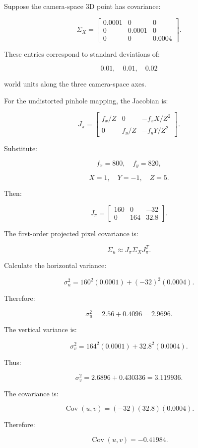 \hypertarget{02-foundations-ii-ch037-derive-the-image-space-uncertainty}{}

Suppose the camera-space 3D point has covariance:

\[
 \Sigma_X= \begin{bmatrix} 0.0001&0&0\\ 0&0.0001&0\\ 0&0&0.0004 \end{bmatrix}.
\]

These entries correspond to standard deviations of:

\[
 0.01,\quad0.01,\quad0.02
\]

world units along the three camera-space axes.

For the undistorted pinhole mapping, the Jacobian is:

\[
 J_\pi= \begin{bmatrix} f_x/Z&0&-f_xX/Z^2\\ 0&f_y/Z&-f_yY/Z^2 \end{bmatrix}.
\]

Substitute:

\[
 f_x=800,\quad f_y=820,
\]

\[
 X=1,\quad Y=-1,\quad Z=5.
\]

Then:

\[
 \boxed{ J_\pi= \begin{bmatrix} 160&0&-32\\ 0&164&32.8 \end{bmatrix} }.
\]

The first-order projected pixel covariance is:

\[
 \Sigma_u\approx J_\pi\Sigma_XJ_\pi^T.
\]

Calculate the horizontal variance:

\[
 \sigma_u^2= 160^2(0.0001)+(-32)^2(0.0004).
\]

Therefore:

\[
 \sigma_u^2=2.56+0.4096 =\boxed{2.9696}.
\]

The vertical variance is:

\[
 \sigma_v^2= 164^2(0.0001)+32.8^2(0.0004).
\]

Thus:

\[
 \sigma_v^2= 2.6896+0.430336 =\boxed{3.119936}.
\]

The covariance is:

\[
 \operatorname{Cov}(u,v) = (-32)(32.8)(0.0004).
\]

Therefore:

\[
 \boxed{ \operatorname{Cov}(u,v)=-0.41984 }.
\]

